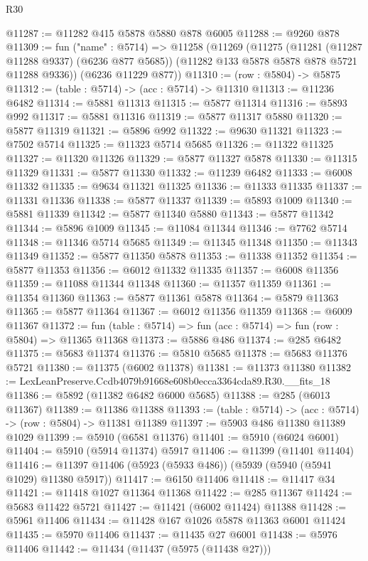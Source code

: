\begin{lexlean}{R30}
\begin{coremodule}
@11287 := @11282 @415 @5878 @5880 @878 @6005
@11288 := @9260 @878
@11309 := fun ("name" : @5714) =>
  @11258
    (@11269
      (@11275
        (@11281 (@11287 @11288 @9337) (@6236 @877 @5685))
        (@11282 @133 @5878 @5878 @878 @5721 @11288 @9336))
      (@6236 @11229 @877))
@11310 := (row : @5804) -> @5875
@11312 := (table : @5714) -> (acc : @5714) -> @11310
@11313 := @11236 @6482
@11314 := @5881 @11313
@11315 := @5877 @11314
@11316 := @5893 @992
@11317 := @5881 @11316
@11319 := @5877 @11317 @5880
@11320 := @5877 @11319
@11321 := @5896 @992
@11322 := @9630 @11321
@11323 := @7502 @5714
@11325 := @11323 @5714 @5685
@11326 := @11322 @11325
@11327 := @11320 @11326
@11329 := @5877 @11327 @5878
@11330 := @11315 @11329
@11331 := @5877 @11330
@11332 := @11239 @6482
@11333 := @6008 @11332
@11335 := @9634 @11321 @11325
@11336 := @11333 @11335
@11337 := @11331 @11336
@11338 := @5877 @11337
@11339 := @5893 @1009
@11340 := @5881 @11339
@11342 := @5877 @11340 @5880
@11343 := @5877 @11342
@11344 := @5896 @1009
@11345 := @11084 @11344
@11346 := @7762 @5714
@11348 := @11346 @5714 @5685
@11349 := @11345 @11348
@11350 := @11343 @11349
@11352 := @5877 @11350 @5878
@11353 := @11338 @11352
@11354 := @5877 @11353
@11356 := @6012 @11332 @11335
@11357 := @6008 @11356
@11359 := @11088 @11344 @11348
@11360 := @11357 @11359
@11361 := @11354 @11360
@11363 := @5877 @11361 @5878
@11364 := @5879 @11363
@11365 := @5877 @11364
@11367 := @6012 @11356 @11359
@11368 := @6009 @11367
@11372 := fun (table : @5714) => fun (acc : @5714) => fun (row : @5804) => @11365 @11368
@11373 := @5886 @486
@11374 := @285 @6482
@11375 := @5683 @11374
@11376 := @5810 @5685
@11378 := @5683 @11376 @5721
@11380 := @11375 (@6002 @11378)
@11381 := @11373 @11380
@11382 := LexLeanPreserve.Ccdb4079b91668e608b0ecca3364cda89.R30.__fits_18
@11386 := @5892 (@11382 @6482 @6000 @5685)
@11388 := @285 (@6013 @11367)
@11389 := @11386 @11388
@11393 := (table : @5714) -> (acc : @5714) -> (row : @5804) -> @11381 @11389
@11397 := @5903 @486 @11380 @11389 @1029
@11399 := @5910 (@6581 @11376)
@11401 := @5910 (@6024 @6001)
@11404 := @5910 (@5914 @11374) @5917
@11406 := @11399 (@11401 @11404)
@11416 := @11397 @11406 (@5923 (@5933 @486)) (@5939 (@5940 (@5941 @1029) @11380 @5917))
@11417 := @6150 @11406
@11418 := @11417 @34
@11421 := @11418 @1027 @11364 @11368
@11422 := @285 @11367
@11424 := @5683 @11422 @5721
@11427 := @11421 (@6002 @11424) @11388
@11428 := @5961 @11406
@11434 := @11428 @167 @1026 @5878 @11363 @6001 @11424
@11435 := @5970 @11406
@11437 := @11435 @27 @6001
@11438 := @5976 @11406
@11442 := @11434 (@11437 (@5975 (@11438 @27)))

\end{coremodule}
\end{lexlean}
